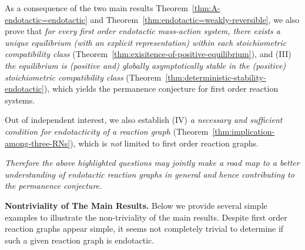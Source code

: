 \documentclass[10pt]{amsart}
\numberwithin{equation}{section}
\theoremstyle{plain}
\theoremstyle{definition}
\theoremstyle{remark}
\begin{document}
{As a consequence of the two main results Theorem~\ref{thm:A-endotactic=endotactic} and Theorem~\ref{thm:endotactic=weakly-reversible}, we also prove that \emph{for every  first order endotactic  mass-action system,  \emph{there exists a unique equilibrium   (with an explicit representation) within each stoichiometric compatibility class}}  (Theorem~\ref{thm:exisitence-of-positive-equilibrium}), and (III) \emph{the equilibrium is (positive and) globally asymptotically stable in the (positive) stoichiometric compatibility class} (Theorem~\ref{thm:deterministic-stability-endotactic}),} which yields  the permanence conjecture for first order reaction systems.


Out of independent interest, we also establish (IV) \emph{a necessary and sufficient condition for endotacticity of a reaction graph} (Theorem~\ref{thm:implication-among-three-RNs}), which is \emph{not} limited to first order reaction graphs.


\emph{Therefore the above highlighted questions may jointly make a road map to a better  understanding of endotactic reaction graphs in general and hence contributing to the permanence conjecture.} 
\smallskip


\noindent\textbf{Nontriviality of The Main Results.} Below we provide several simple examples to illustrate the non-triviality of the main results. Despite first order reaction graphs appear simple, it seems not completely trivial to determine if such a given reaction graph is endotactic.
\end{document}
